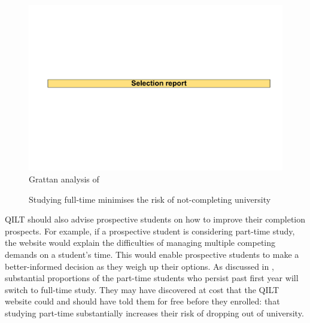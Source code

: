                 \begin{figure}[t]
                    \caption{Studying full-time minimises the risk of not-completing university\label{fig:extra1}}%
                    \includegraphics[page=40]{atlas/selection_chartdeck.pdf} 
                    {Grattan analysis of \textcite{DepartmentofEducationandTraininga}}
                \end{figure}

QILT should also advise prospective students on how to improve their completion prospects. For example, if a prospective student is considering part-time study, the website would explain the difficulties of managing multiple competing demands on a student's time. This would enable prospective students to make a better-informed decision as they weigh up their options. As discussed in , substantial proportions of the part-time students who persist past first year will switch to full-time study. They may have discovered at cost that the QILT website could and should have told them for free before they enrolled: that studying part-time substantially increases their risk of dropping out of university.

